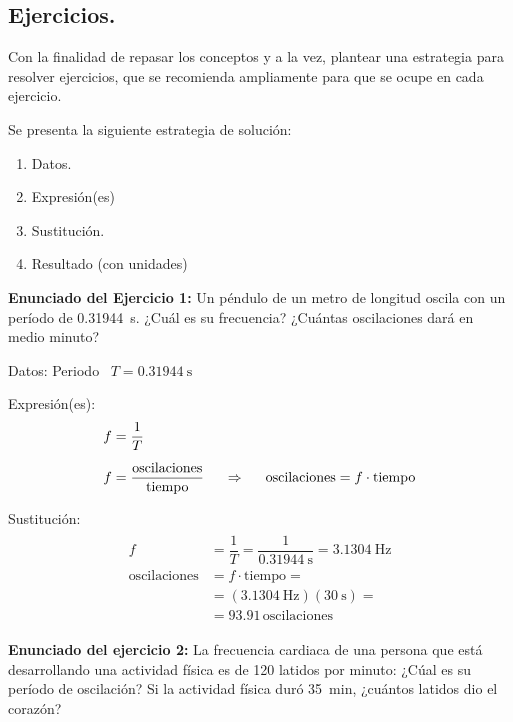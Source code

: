 \documentclass[12pt, letter]{article}
\begin{document}
\subsection{Ejercicios.}

Con la finalidad de repasar los conceptos y a la vez, plantear una estrategia para resolver ejercicios, que se recomienda ampliamente para que se ocupe en cada ejercicio.

Se presenta la siguiente estrategia de solución:
\begin{enumerate}
\item Datos.
\item Expresión(es)
\item Sustitución.
\item Resultado (con unidades)
\end{enumerate}
    
\textbf{Enunciado del Ejercicio 1: } Un péndulo de un metro de longitud oscila con un período de \SI{0.31944}{\second}. ¿Cuál es su frecuencia? ¿Cuántas oscilaciones dará en medio minuto?

Datos:  Periodo \, $T = \SI{0.31944}{\second}$

Expresión(es):
\begin{eqnarray*}
\begin{aligned}
f &= \dfrac{1}{T} \\[0.5em] 
f &= \dfrac{\text{oscilaciones}}{\text{tiempo}}  \hspace{0.5cm} \Rightarrow \hspace{0.5cm} \text{oscilaciones} = f \cdot \text{tiempo}
\end{aligned}
\end{eqnarray*}

Sustitución:
\begin{eqnarray*}
\begin{aligned}
f &= \dfrac{1}{T} =  \dfrac{1}{\SI{0.31944}{\second}} =  \SI{3.1304}{\hertz} \\[0.5em] 
\text{oscilaciones} &= f \cdot \text{tiempo} = \\[0.5em] 
&= (\SI{3.1304}{\hertz})(\SI{30}{\second}) = \\[0.5em]  
&= 93.91 \, \text{oscilaciones}
\end{aligned}
\end{eqnarray*}

\textbf{Enunciado del ejercicio 2: } La frecuencia cardiaca de una persona que está desarrollando una actividad física es de 120 latidos por minuto: ¿Cúal es su período de oscilación? Si la actividad física duró \SI{35}{\minute}, ¿cuántos latidos dio el corazón?
\end{document}
